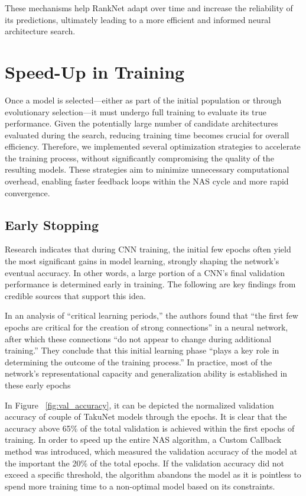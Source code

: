 These mechanisms help RankNet adapt over time and increase the reliability of its predictions, ultimately leading to a more efficient and informed neural architecture search.






\section{Speed-Up in Training}

Once a model is selected—either as part of the initial population or through evolutionary selection—it must undergo full training to evaluate its true performance. Given the potentially large number of candidate architectures evaluated during the search, reducing training time becomes crucial for overall efficiency. Therefore, we implemented several optimization strategies to accelerate the training process, without significantly compromising the quality of the resulting models. These strategies aim to minimize unnecessary computational overhead, enabling faster feedback loops within the NAS cycle and more rapid convergence.

\subsection{Early Stopping}

Research indicates that during CNN training, the initial few epochs often yield the most significant gains in model learning, strongly shaping the network’s eventual accuracy. In other words, a large portion of a CNN’s final validation performance is determined early in training. The following are key findings from credible sources that support this idea.

In an analysis of “critical learning periods,” the authors found that “the first few epochs are critical for the creation of strong connections” in a neural network, after which these connections “do not appear to change during additional training.” They conclude that this initial learning phase “plays a key role in determining the outcome of the training process.” In practice, most of the network’s representational capacity and generalization ability is established in these early epochs \cite{achille2017critical}

In Figure ~\ref{fig:val_accuracy}, it can be depicted the normalized validation accuracy of couple of TakuNet models through the epochs. 
It is clear that the accuracy above 65\% of the total validation is achieved within the first epochs of training.
In order to speed up the entire NAS algorithm, a Custom Callback method was introduced, which measured the validation accuracy of the model at the important the 20\% of the total epochs. If the validation accuracy did not exceed a specific threshold, the algorithm abandons the model as it is pointless to spend more training time to a non-optimal model based on its constraints.

